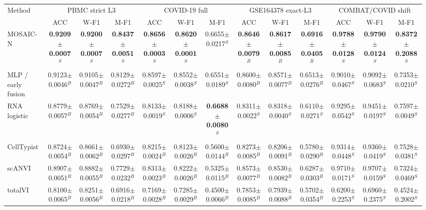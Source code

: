 \begin{tabular}{p{1.9cm}cccccccccccc}
\toprule
\multirow{2}{*}{Method} & \multicolumn{3}{c}{PBMC strict L3} & \multicolumn{3}{c}{COVID-19 full} & \multicolumn{3}{c}{GSE164378 exact-L3} & \multicolumn{3}{c}{COMBAT/COVID shift} \\
\cmidrule(lr){2-4}\cmidrule(lr){5-7}\cmidrule(lr){8-10}\cmidrule(lr){11-13}
 & ACC & W-F1 & M-F1 & ACC & W-F1 & M-F1 & ACC & W-F1 & M-F1 & ACC & W-F1 & M-F1 \\
\midrule
MOSAIC-N & \textbf{0.9209$\pm$0.0007}$^{S}$ & \textbf{0.9200$\pm$0.0007}$^{S}$ & \textbf{0.8437$\pm$0.0051}$^{S}$ & \textbf{0.8656$\pm$0.0003}$^{S}$ & \textbf{0.8620$\pm$0.0001}$^{S}$ & 0.6655$\pm$0.0217$^{S}$ & \textbf{0.8646$\pm$0.0079}$^{B}$ & \textbf{0.8617$\pm$0.0085}$^{B}$ & \textbf{0.6916$\pm$0.0405}$^{B}$ & \textbf{0.9788$\pm$0.0128}$^{S}$ & \textbf{0.9790$\pm$0.0124}$^{S}$ & \textbf{0.8372$\pm$0.2088}$^{S}$ \\
MLP / early fusion & 0.9123$\pm$0.0046$^{B}$ & 0.9105$\pm$0.0047$^{B}$ & 0.8129$\pm$0.0272$^{B}$ & 0.8597$\pm$0.0025$^{S}$ & 0.8552$\pm$0.0038$^{S}$ & 0.6551$\pm$0.0189$^{S}$ & 0.8600$\pm$0.0080$^{B}$ & 0.8571$\pm$0.0077$^{B}$ & 0.6513$\pm$0.0276$^{B}$ & 0.9010$\pm$0.0467$^{S}$ & 0.9092$\pm$0.0683$^{S}$ & 0.7353$\pm$0.0210$^{S}$ \\
RNA logistic & 0.8779$\pm$0.0057$^{B}$ & 0.8769$\pm$0.0054$^{B}$ & 0.7529$\pm$0.0277$^{B}$ & 0.8133$\pm$0.0019$^{S}$ & 0.8188$\pm$0.0006$^{S}$ & \textbf{0.6688$\pm$0.0080}$^{S}$ & 0.8311$\pm$0.0022$^{S}$ & 0.8318$\pm$0.0040$^{S}$ & 0.6110$\pm$0.0271$^{S}$ & 0.9295$\pm$0.0542$^{S}$ & 0.9451$\pm$0.0197$^{S}$ & 0.7597$\pm$0.0049$^{S}$ \\
CellTypist & 0.8724$\pm$0.0054$^{B}$ & 0.8661$\pm$0.0062$^{B}$ & 0.6930$\pm$0.0297$^{B}$ & 0.8215$\pm$0.0024$^{B}$ & 0.8123$\pm$0.0026$^{B}$ & 0.5600$\pm$0.0144$^{B}$ & 0.8273$\pm$0.0085$^{B}$ & 0.8206$\pm$0.0091$^{B}$ & 0.5780$\pm$0.0290$^{B}$ & 0.9314$\pm$0.0448$^{S}$ & 0.9360$\pm$0.0419$^{S}$ & 0.7528$\pm$0.0381$^{S}$ \\
scANVI & 0.8907$\pm$0.0051$^{B}$ & 0.8882$\pm$0.0055$^{B}$ & 0.7729$\pm$0.0232$^{B}$ & 0.8313$\pm$0.0023$^{B}$ & 0.8222$\pm$0.0026$^{B}$ & 0.5325$\pm$0.0115$^{B}$ & 0.8573$\pm$0.0077$^{B}$ & 0.8530$\pm$0.0082$^{B}$ & 0.6287$\pm$0.0303$^{B}$ & 0.9710$\pm$0.0171$^{S}$ & 0.9707$\pm$0.0159$^{S}$ & 0.7324$\pm$0.0469$^{S}$ \\
totalVI & 0.8100$\pm$0.0065$^{B}$ & 0.8251$\pm$0.0056$^{B}$ & 0.6916$\pm$0.0218$^{B}$ & 0.7169$\pm$0.0028$^{B}$ & 0.7285$\pm$0.0029$^{B}$ & 0.4500$\pm$0.0066$^{B}$ & 0.7853$\pm$0.0085$^{B}$ & 0.7939$\pm$0.0088$^{B}$ & 0.5702$\pm$0.0354$^{B}$ & 0.6200$\pm$0.2253$^{S}$ & 0.6960$\pm$0.2375$^{S}$ & 0.4524$\pm$0.2002$^{S}$ \\

\end{tabular}
